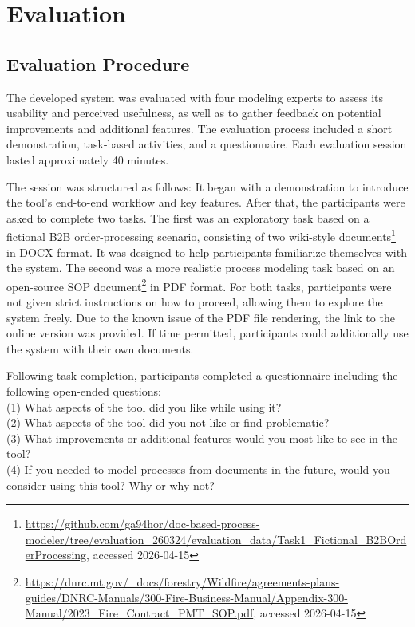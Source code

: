 \FloatBarrier
\chapter{Evaluation}
\label{sec:evaluation} 

\section{Evaluation Procedure}
The developed system was evaluated with four modeling experts to assess its usability and perceived usefulness, as well as to gather feedback on potential improvements and additional features. The evaluation process included a short demonstration, task-based activities, and a questionnaire. Each evaluation session lasted approximately 40 minutes.

The session was structured as follows: It began with a demonstration to introduce the tool's end-to-end workflow and key features. After that, the participants were asked to complete two tasks. The first was an exploratory task based on a fictional B2B order-processing scenario, consisting of two wiki-style documents\footnote{\url{https://github.com/ga94hor/doc-based-process-modeler/tree/evaluation_260324/evaluation_data/Task1_Fictional_B2BOrderProcessing}, accessed 2026-04-15} in DOCX format. It was designed to help participants familiarize themselves with the system. The second was a more realistic process modeling task based on an open-source SOP document\footnote{\url{https://dnrc.mt.gov/_docs/forestry/Wildfire/agreements-plans-guides/DNRC-Manuals/300-Fire-Business-Manual/Appendix-300-Manual/2023_Fire_Contract_PMT_SOP.pdf}, accessed 2026-04-15} in PDF format. For both tasks, participants were not given strict instructions on how to proceed, allowing them to explore the system freely. Due to the known issue of the PDF file rendering, the link to the online version was provided. If time permitted, participants could additionally use the system with their own documents. 

Following task completion, participants completed a questionnaire including the following open-ended questions: \\
(1) What aspects of the tool did you like while using it? \\
(2) What aspects of the tool did you not like or find problematic? \\
(3) What improvements or additional features would you most like to see in the tool? \\
(4) If you needed to model processes from documents in the future, would you consider using this tool? Why or why not?

